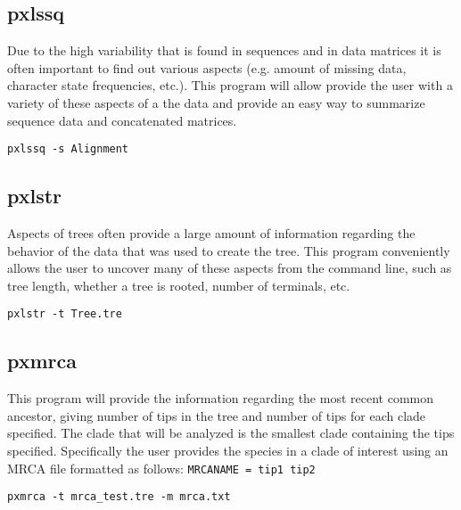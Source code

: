 \documentclass[12pt,letterpaper]{memoir}
\begin{document}
\subsection{pxlssq}

Due to the high variability that is found in sequences and in data matrices it is often important to find out various aspects (e.g. amount of missing data, character state frequencies, etc.). This program will allow provide the user with a variety of these aspects of a the data and provide an easy way to summarize sequence data and concatenated matrices.

\begin{flushleft}
\begin{verbatim}
pxlssq -s Alignment
\end{verbatim}
\end{flushleft}

\subsection{pxlstr}

Aspects of trees often provide a large amount of information regarding the behavior of the data that was used to create the tree. This program conveniently allows the user to uncover many of these aspects from the command line, such as tree length, whether a tree is rooted, number of terminals, etc.

\begin{flushleft}
\begin{verbatim}
pxlstr -t Tree.tre
\end{verbatim}
\end{flushleft}

\subsection{pxmrca}

This program will provide the information regarding the most recent common ancestor, giving number of tips in the tree and number of tips for each clade specified. The clade that will be analyzed is the smallest clade containing the tips specified. Specifically the user provides the species in a clade of interest using an MRCA file formatted as follows:
\texttt{MRCANAME = tip1 tip2}

\begin{flushleft}
\begin{verbatim}
pxmrca -t mrca_test.tre -m mrca.txt
\end{verbatim}
\end{flushleft}
\end{document}
